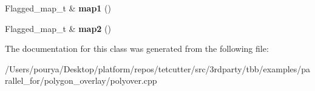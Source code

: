 \begin{DoxyCompactItemize}
\item 
\hypertarget{classblocked__range__with__maps_a05eb9d0aafa06f7b5c2c4ace230fd422}{}Flagged\+\_\+map\+\_\+t \& {\bfseries map1} ()\label{classblocked__range__with__maps_a05eb9d0aafa06f7b5c2c4ace230fd422}

\item 
\hypertarget{classblocked__range__with__maps_a04166c0173cbba5070482619842ba34d}{}Flagged\+\_\+map\+\_\+t \& {\bfseries map2} ()\label{classblocked__range__with__maps_a04166c0173cbba5070482619842ba34d}

\end{DoxyCompactItemize}


The documentation for this class was generated from the following file\+:\begin{DoxyCompactItemize}
\item 
/\+Users/pourya/\+Desktop/platform/repos/tetcutter/src/3rdparty/tbb/examples/parallel\+\_\+for/polygon\+\_\+overlay/polyover.\+cpp\end{DoxyCompactItemize}
